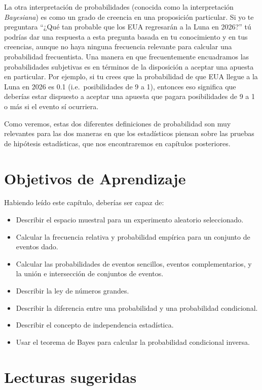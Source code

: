 \documentclass[
  12pt,
]{book}
\providecommand{\tightlist}{%
  \setlength{\itemsep}{0pt}\setlength{\parskip}{0pt}}
\theoremstyle{definition}
\theoremstyle{definition}
\theoremstyle{definition}
\theoremstyle{remark}
\begin{document}
La otra interpretación de probabilidades (conocida como la interpretación \emph{Bayesiana}) es como un grado de creencia en una proposición particular. Si yo te preguntara ``¿Qué tan probable que los EUA regresarán a la Luna en 2026?'' tú podrías dar una respuesta a esta pregunta basada en tu conocimiento y en tus creencias, aunque no haya ninguna frecuencia relevante para calcular una probabilidad frecuentista. Una manera en que frecuentemente encuadramos las probabilidades subjetivas es en términos de la disposición a aceptar una apuesta en particular. Por ejemplo, si tu crees que la probabilidad de que EUA llegue a la Luna en 2026 es 0.1 (i.e.~posibilidades de 9 a 1), entonces eso significa que deberías estar dispuesto a aceptar una apuesta que pagara posibilidades de 9 a 1 o más si el evento sí ocurriera.

Como veremos, estas dos diferentes definiciones de probabilidad son muy relevantes para las dos maneras en que los estadísticos piensan sobre las pruebas de hipótesis estadísticas, que nos encontraremos en capítulos posteriores.

\hypertarget{objetivos-de-aprendizaje}{%
\section{Objetivos de Aprendizaje}\label{objetivos-de-aprendizaje}}

Habiendo leído este capítulo, deberías ser capaz de:

\begin{itemize}
\tightlist
\item
  Describir el espacio muestral para un experimento aleatorio seleccionado.
\item
  Calcular la frecuencia relativa y probabilidad empírica para un conjunto de eventos dado.
\item
  Calcular las probabilidades de eventos sencillos, eventos complementarios, y la unión e intersección de conjuntos de eventos.
\item
  Describir la ley de números grandes.
\item
  Describir la diferencia entre una probabilidad y una probabilidad condicional.
\item
  Describir el concepto de independencia estadística.
\item
  Usar el teorema de Bayes para calcular la probabilidad condicional inversa.
\end{itemize}

\hypertarget{lecturas-sugeridas}{%
\section{Lecturas sugeridas}\label{lecturas-sugeridas}}
\end{document}
